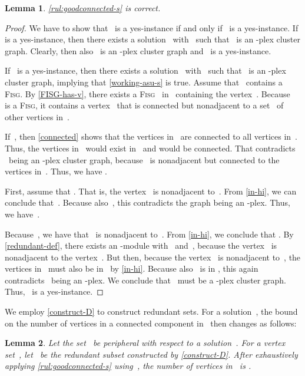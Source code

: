 \documentclass[12pt, a4paper, abstracton]{scrreprt}
\newcommand{\md}[1]{\mbox{-module}}
\newcommand{\pl}[1]{\mbox{-plex}}
\newcommand{\pcg}[1]{\pl #1 cluster graph}
\newcommand{\FISG}{\textsc{Fisg}}
\newcounter{theorem}
\newtheorem{lemma}{Lemma}[chapter]
\theoremstyle{definition}
\theoremstyle{remark}
\begin{document}
\begin{lemma}\label{goodconnected-correct-s}
  \autoref{rul:goodconnected-s} is
  correct.
\end{lemma}

\begin{proof}
  We have to show that~ is a yes-instance if and only
  if~ is a yes-instance. If  is a yes-instance, then there
  exists a solution~ with~ such that ~is an \pcg
  s. Clearly, then also ~is an \pcg s and ~is a
  yes-instance.

  If ~is a yes-instance, then there exists a solution~ with~ such that ~is an \pcg s, implying that \autoref{working-asu-s} is true. Assume that ~contains a \FISG{}. By \autoref{FISG-has-v}, there exists a \FISG{}~ in~ containing the vertex~.  Because~ is a \FISG{}, it contains a vertex~ that is connected but nonadjacent to a set~ of  other vertices in~.

  If~, then \autoref{connected} shows that the
  vertices in~ are connected to all vertices
  in~. Thus, the vertices in~
  would exist in~ and would be connected. That contradicts
  ~being an \pcg s, because~ is nonadjacent but connected to
  the~ vertices in~. Thus, we have .

  First, assume that . That is, the vertex~ is
  nonadjacent to~. From \autoref{in-hi}, we can conclude
  that~. Because also~,
  this contradicts the graph  being an \pl s. Thus,
  we have~.

  Because~, we have that~ is nonadjacent to~. From \autoref{in-hi}, we conclude that . By \autoref{redundant-def}, there exists an \md X  with~ and~, because the vertex~ is nonadjacent to the vertex~. But then, because the vertex~ is nonadjacent to~, the vertices in~ must also be in~ by \autoref{in-hi}. Because also~ is in , this again contradicts~ being an \pl s. We conclude that ~must be a \pcg s.  Thus, ~is a yes-instance.
\end{proof}

\noindent We employ \autoref{construct-D} to construct redundant
sets. For a solution~, the bound on the number
of vertices in a connected component in~ then changes as follows:
 
\begin{lemma}\label{h1-vertices-s}
  Let the set~ be peripheral with respect to a solution~.  For
  a vertex set~, let~ be the redundant subset constructed by
  \autoref{construct-D}. After exhaustively applying
  \autoref{rul:goodconnected-s} using~, the number of vertices
  in~ is .
\end{lemma}
 
\end{document}
